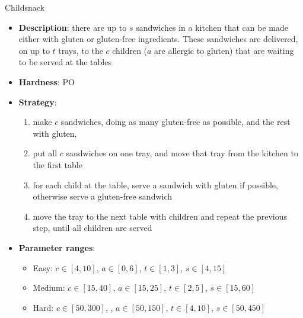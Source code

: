 \documentclass[aspectratio=169,xcolor=dvipsnames]{beamer}
\begin{document}
\begin{frame}{Childsnack}

    \begin{itemize}
        \item \textbf{Description}: there are up to $s$ sandwiches in a kitchen that can be made either with gluten or gluten-free ingredients. These sandwiches are delivered, on up to $t$ trays, to the $c$ children ($a$ are allergic to gluten) that are waiting to be served at the tables
        \item \textbf{Hardness}: PO %
        \item \textbf{Strategy}:
        \begin{enumerate}
            \item make $c$ sandwiches, doing as many gluten-free as possible, and the rest with gluten,
            \item put all $c$ sandwiches on one tray, and move that tray from the kitchen to the first table
            \item for each child at the table, serve a sandwich with gluten if possible, otherwise serve a gluten-free sandwich
            \item move the tray to the next table with children and repeat the previous step, until all children are served
        \end{enumerate}
        \item \textbf{Parameter ranges}:
        \begin{itemize}
            \item Easy: $c\in[4, 10]$, $a\in[0, 6]$, $t\in[1, 3]$, $s\in[4, 15]$
            \item Medium: $c\in[15, 40]$, $a\in[15, 25]$, $t\in[2, 5]$, $s\in[15, 60]$
            \item Hard: $c\in[50, 300]$, , $a\in[50, 150]$, $t\in[4, 10]$, $s\in[50, 450]$
        \end{itemize}
    \end{itemize}

\end{frame}
\end{document}
